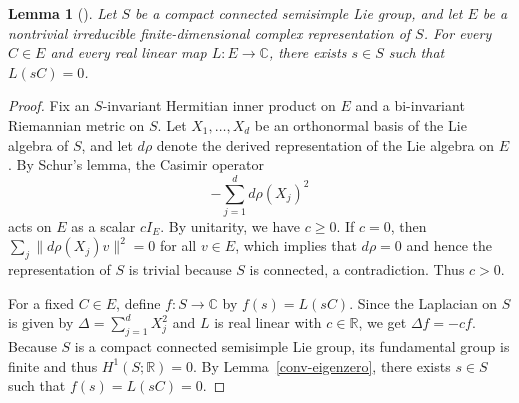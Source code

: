 \documentclass[11pt,reqno]{amsart}
\newtheorem{lemma}[theorem]{Lemma}
\theoremstyle{remark}
\newcommand{\R}{\mathbb R}
\newcommand{\C}{\mathbb C}
\begin{document}
\begin{lemma}[{\cite[Corollary~2, page~204]{Gichev2004}}]\label{conv-repzero}
Let $S$ be a compact connected semisimple Lie group, and let $E$ be
a nontrivial irreducible finite-dimensional complex representation
of $S$. For every $C\in E$ and every real linear map $L:E\to\C$, there
exists $s\in S$ such that $L(sC)=0$.
\end{lemma}
\begin{proof}
Fix an $S$-invariant Hermitian inner product on $E$ and a bi-invariant
Riemannian metric on $S$. Let $X_1,\ldots,X_d$ be an orthonormal basis
of the Lie algebra of $S$, and let $d\rho$ denote the derived
representation of the Lie algebra on $E$. By Schur's lemma, the Casimir
operator
\[
 -\sum_{j=1}^d d\rho(X_j)^2
\]
acts on $E$ as a scalar $cI_E$. By unitarity, we have $c\ge0$. If $c=0$,
then $\sum_j\|d\rho(X_j)v\|^2=0$ for all $v\in E$, which implies that
$d\rho=0$ and hence the representation of $S$ is trivial because $S$ is
connected, a contradiction. Thus $c>0$.

For a fixed $C\in E$, define $f:S\to\C$ by $f(s)=L(sC)$. Since the
Laplacian on $S$ is given by $\Delta=\sum_{j=1}^d X_j^2$ and $L$ is
real linear with $c\in\R$, we get $\Delta f=-cf$. Because $S$ is a
compact connected semisimple Lie group, its fundamental group is finite
and thus $H^1(S;\R)=0$. By Lemma~\ref{conv-eigenzero}, there exists
$s\in S$ such that $f(s)=L(sC)=0$.
\end{proof}
\end{document}
